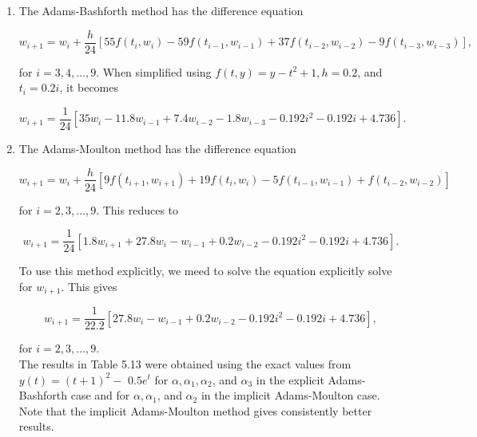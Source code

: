\begin{mysolution}
\begin{enumerate}[label=(\alph*)]
\item The Adams-Bashforth method has the difference equation

$$
w_{i+1}=w_{i}+\frac{h}{24}\left[55 f\left(t_{i}, w_{i}\right)-59 f\left(t_{i-1}, w_{i-1}\right)+37 f\left(t_{i-2}, w_{i-2}\right)-9 f\left(t_{i-3}, w_{i-3}\right)\right],
$$

for $i=3,4, \ldots, 9$. When simplified using $f(t, y)=y-t^{2}+1, h=0.2$, and $t_{i}=0.2 i$, it becomes

$$
w_{i+1}=\frac{1}{24}\left[35 w_{i}-11.8 w_{i-1}+7.4 w_{i-2}-1.8 w_{i-3}-0.192 i^{2}-0.192 i+4.736\right] .
$$

\item The Adams-Moulton method has the difference equation

$$
w_{i+1}=w_{i}+\frac{h}{24}\left[9 f\left(t_{i+1}, w_{i+1}\right)+19 f\left(t_{i}, w_{i}\right)-5 f\left(t_{i-1}, w_{i-1}\right)+f\left(t_{i-2}, w_{i-2}\right)\right]
$$

for $i=2,3, \ldots, 9$. This reduces to

$$
w_{i+1}=\frac{1}{24}\left[1.8 w_{i+1}+27.8 w_{i}-w_{i-1}+0.2 w_{i-2}-0.192 i^{2}-0.192 i+4.736\right] .
$$

To use this method explicitly, we meed to solve the equation explicitly solve for $w_{i+1}$. This gives

$$
w_{i+1}=\frac{1}{22.2}\left[27.8 w_{i}-w_{i-1}+0.2 w_{i-2}-0.192 i^{2}-0.192 i+4.736\right],
$$

for $i=2,3, \ldots, 9$.\\
The results in Table 5.13 were obtained using the exact values from $y(t)=(t+1)^{2}-$ $0.5 e^{t}$ for $\alpha, \alpha_{1}, \alpha_{2}$, and $\alpha_{3}$ in the explicit Adams-Bashforth case and for $\alpha, \alpha_{1}$, and $\alpha_{2}$ in the implicit Adams-Moulton case. Note that the implicit Adams-Moulton method gives consistently better results.
\end{enumerate}
\end{mysolution}



